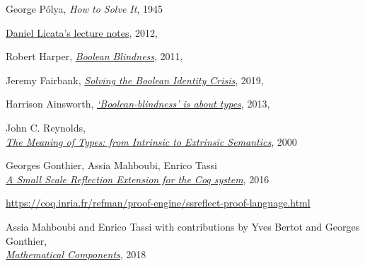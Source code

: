 \documentclass[declaration,mgr,english,shortabstract]{iithesis}
\begin{document}
\begin{thebibliography}{1}
    George Pólya,
    \textit{How to Solve It},
    1945

    \href{https://www.cs.cmu.edu/~15150/previous-semesters/2012-spring/resources/lectures/09.pdf}{Daniel Licata's lecture notes},
    2012, \\

    Robert Harper,
    \href{https://existentialtype.wordpress.com/2011/03/15/boolean-blindness/}{\textit{Boolean Blindness}},
    2011, \\

    Jeremy Fairbank,
    \href{https://medium.com/swlh/solving-the-boolean-identity-crisis-33eeccde2c96}{\textit{Solving the Boolean Identity Crisis}},
    2019, \\

    Harrison Ainsworth,
    \href{http://www.hxa.name/notes/note-hxa7241-20131124T0927Z.html}{\textit{‘Boolean-blindness’ is about types}},
    2013, \\

    John C. Reynolds, \\
    \href{https://www.cs.cmu.edu/afs/cs/user/jcr/ftp/typemeaning.pdf}{\textit{The Meaning of Types: from Intrinsic to Extrinsic Semantics}},
    2000

    Georges Gonthier, Assia Mahboubi, Enrico Tassi \\
    \href{https://hal.inria.fr/inria-00258384v17/document}{\textit{A Small Scale Reflection Extension for the Coq system}},
    2016

    \url{https://coq.inria.fr/refman/proof-engine/ssreflect-proof-language.html}

    Assia Mahboubi and Enrico Tassi with contributions by Yves Bertot and Georges Gonthier, \\
    \href{https://math-comp.github.io/mcb/}{\textit{Mathematical Components}},
    2018


\end{thebibliography}
\end{document}

